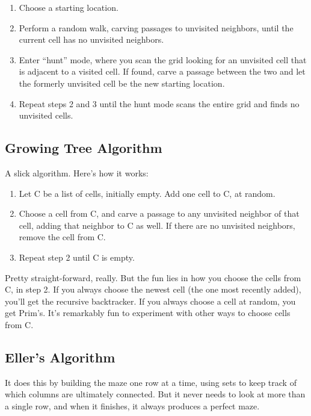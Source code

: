 \documentclass{article}
\begin{document}
\begin{enumerate}
    \item Choose a starting location.
    \item Perform a random walk, carving passages to unvisited neighbors, until the current cell has no unvisited neighbors.
    \item Enter “hunt” mode, where you scan the grid looking for an unvisited cell that is adjacent to a visited cell. If found, carve a passage between the two and let the formerly unvisited cell be the new starting location.
    \item Repeat steps 2 and 3 until the hunt mode scans the entire grid and finds no unvisited cells.
\end{enumerate}

\subsection{Growing Tree Algorithm}
A slick algorithm. Here's how it works:

\begin{enumerate}
    \item Let C be a list of cells, initially empty. Add one cell to C, at random.
    \item Choose a cell from C, and carve a passage to any unvisited neighbor of that cell, adding that neighbor to C as well. If there are no unvisited neighbors, remove the cell from C.
    \item Repeat step 2 until C is empty.
\end{enumerate}

Pretty straight-forward, really. But the fun lies in how you choose the cells from C, in step 2. If you always choose the newest cell (the one most recently added), you'll get the recursive backtracker. If you always choose a cell at random, you get Prim's. It's remarkably fun to experiment with other ways to choose cells from C.

\subsection{Eller's Algorithm}
It does this by building the maze one row at a time, using sets to keep track of which columns are ultimately connected. But it never needs to look at more than a single row, and when it finishes, it always produces a perfect maze.
\end{document}

